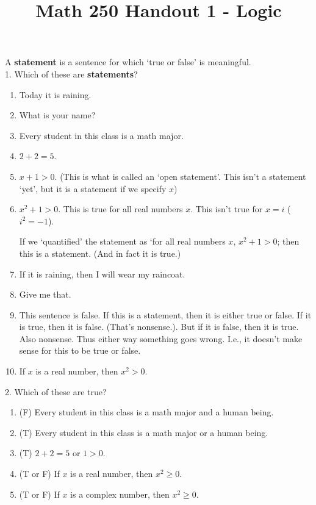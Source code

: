 \documentclass[12pt, reqno]{amsart}
\begin{document}
\title[Math 250 Handout 1 - Logic]{Math 250 Handout 1 - Logic}\maketitle


A \textbf{statement} is a sentence for which `true or false' is meaningful.
\\

1. Which of these are \textbf{statements}? 
\vspace{10pt}
\begin{enumerate}
\item Today it is raining.
\item {\color{red} What is your name?}
\item Every student in this class is a math major.
\item $2 + 2 = 5$.
\item {\color{red} $x + 1  > 0$.} (This is what is called an `open statement'. This isn't a statement `yet', but it is a statement if we specify $x$)
\item {\color{red} $x^2 + 1  > 0$.} This is true for all real numbers $x$. This isn't true for $x = i$ ($i^2 = -1$). 

If we `quantified' the statement as `for all real numbers $x$, $x^2 + 1 > 0$; then this is a statement. (And in fact it is true.) 
\item If it is raining, then I will wear my raincoat.
\item {\color{red} Give me that.}
\item {\color{red} This sentence is false.} If this is a statement, then it is either true or false. If it is true, then it is false. (That's nonsense.). But if it is false, then it is true. Also nonsense. Thus either way something goes wrong. I.e., it doesn't make sense for this to be true or false.
\item If $x$ is a real number, then $x^2 > 0$.
\end{enumerate}
\vspace{20pt}

2. Which of these are true? 
\vspace{10pt}
\begin{enumerate}
\item (F) Every student in this class is a math major and a human being.
\item (T) Every student in this class is a math major or a human being.
\item (T) $2 + 2 = 5$ or  $1  > 0$.
\item (T or F) If $x$ is a real number, then $x^2 \geq 0$.
\item (T or F) If $x$ is a complex number, then $x^2 \geq 0$.
\end{enumerate}
\vspace{20pt}
\end{document}

